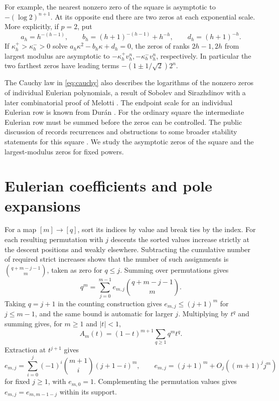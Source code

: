 \documentclass[11pt]{article}
\begin{document}
For example, the nearest nonzero zero of the square is asymptotic to \(- (\log 2)^{n+1}\). At its opposite end there are two zeros at each exponential scale. More explicitly, if \(p=2\), put
\begin{equation}\label{eq:quadratic}
 a_h=h^{-(h-1)},\qquad b_h=(h+1)^{-(h-1)}+h^{-h},\qquad d_h=(h+1)^{-h}.
\end{equation}
If \(\kappa_h^+>\kappa_h^->0\) solve \(a_h\kappa^2-b_h\kappa+d_h=0\), the zeros of ranks \(2h-1,2h\) from largest modulus are asymptotic to \(-\kappa_h^+v_h^n,-\kappa_h^-v_h^n\), respectively. In particular the two farthest zeros have leading terms \(- (1\pm1/\sqrt2) 2^n\).

The Cauchy law in \eqref{eq:cauchy} also describes the logarithms of the nonzero zeros of individual Eulerian polynomials, a result of Sobolev and Sirazhdinov with a later combinatorial proof of Melotti \cite{Sob,Sir,Mel}. The endpoint scale for an individual Eulerian row is known from Dur\'an \cite[Theorem 2]{Duran}. For the ordinary square the intermediate Eulerian row must be summed before the zeros can be controlled. The public discussion of \cite{MW} records recurrences and obstructions to some broader stability statements for this square \cite{Public}. We study the asymptotic zeros of the square and the largest-modulus zeros for fixed powers.

\section{Eulerian coefficients and pole expansions}

For a map \([m]\to[q]\), sort its indices by value and break ties by the index. For each resulting permutation with \(j\) descents the sorted values increase strictly at the descent positions and weakly elsewhere. Subtracting the cumulative number of required strict increases shows that the number of such assignments is \(\binom{q+m-j-1}{m}\), taken as zero for \(q\le j\). Summing over permutations gives
\[
 q^m=\sum_{j=0}^{m-1} e_{m,j}\binom{q+m-j-1}{m}.
\]
Taking \(q=j+1\) in the counting construction gives \(e_{m,j}\le (j+1)^m\) for \(j\le m-1\), and the same bound is automatic for larger \(j\). Multiplying by \(t^q\) and summing gives, for \(m\ge1\) and \(|t|<1\),
\[
 A_m(t)=(1-t)^{m+1}\sum_{q\ge1}q^m t^q.
\]
Extraction at \(t^{j+1}\) gives
\begin{equation}\label{eq:coef}
 e_{m,j}=\sum_{i=0}^j(-1)^i\binom{m+1}{i}(j+1-i)^m,
 \qquad e_{m,j}=(j+1)^m+O_j((m+1)^j j^m)
\end{equation}
for fixed \(j\ge1\), with \(e_{m,0}=1\). Complementing the permutation values gives \(e_{m,j}=e_{m,m-1-j}\) within its support.
\end{document}
